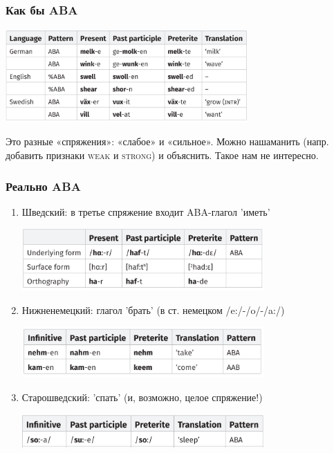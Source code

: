 \documentclass[9pt, t]{beamer}
\begin{document}
\begin{frame}
    \frametitle{Как бы ABA}

    \includegraphics[width=25em]{images/not aba.png}

    Это разные «спряжения»: «слабое» и «сильное». Можно нашаманить (напр. добавить признаки \textsc{weak} и \textsc{strong}) и объяснить. Такое нам не интересно.

\end{frame}

\begin{frame}
    \frametitle{Реально ABA}

    \begin{enumerate}
        \item Шведский: в третье спряжение входит ABA-глагол 'иметь'
        
        \includegraphics[width=25em]{images/har.png}

        \pause
        \item Нижненемецкий: глагол 'брать' (в ст. немецком /e:/-/o/-/a:/)
        
        \includegraphics[width=25em]{images/nehmen.png}

        \pause
        \item Старошведский: 'спать' (и, возможно, целое спряжение!)
        
        \includegraphics[width=25em]{images/sue.png}

    \end{enumerate}
\end{frame}
    
\end{document}
